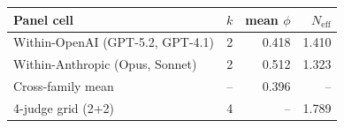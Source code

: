 \begin{tabular}{lrrr}
\toprule
Panel cell & $k$ & mean $\phi$ & $N_{\mathrm{eff}}$\\
\midrule
Within-OpenAI (GPT-5.2, GPT-4.1) & 2 & 0.418 & 1.410 \\
Within-Anthropic (Opus, Sonnet) & 2 & 0.512 & 1.323 \\
Cross-family mean & -- & 0.396 & -- \\
4-judge grid (2+2) & 4 & -- & 1.789 \\
\bottomrule
\end{tabular}